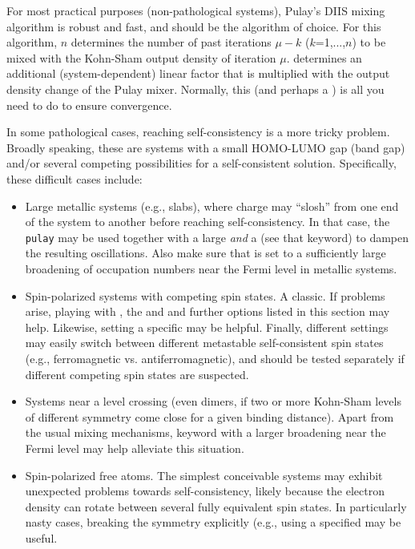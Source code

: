 For most practical purposes (non-pathological systems), Pulay's DIIS
mixing algorithm \cite{Pulay80} is robust and fast, and should be the
algorithm of choice. For this algorithm,  $n$
determines the number of past iterations $\mu-k$ ($k$=1,...,$n$) to be
mixed with the Kohn-Sham output density of iteration
$\mu$.  determines an additional
(system-dependent) linear factor that is multiplied with the output
density change of the Pulay mixer. Normally, this (and perhaps a
) is all you need to do to ensure convergence.

In some pathological cases, reaching self-consistency is a more tricky
problem. Broadly speaking, these are systems with a small HOMO-LUMO
gap (band gap) and/or several competing possibilities for a
self-consistent solution. Specifically, these difficult cases include: 
\begin{itemize}
  \item Large metallic systems (e.g., slabs), where charge may
    ``slosh'' from one end of the system to another before reaching
    self-consistency. In that case, the \texttt{pulay} 
    may be used together with a large 
    \emph{and} a  (see that keyword) to dampen
    the resulting oscillations. Also make sure that
     is set to a sufficiently large
    broadening of occupation numbers near the Fermi level in metallic
    systems. 
  \item Spin-polarized systems with competing spin states. A
    classic. If problems arise, playing with
    , the 
    and  and further options listed in this
    section may help. Likewise, setting a specific
     may be helpful. Finally, different
     settings may easily switch between
    different metastable self-consistent spin states (e.g.,
    ferromagnetic vs. antiferromagnetic), and should be tested
    separately if different competing spin states are suspected.
  \item Systems near a level crossing (even dimers, if two or more
    Kohn-Sham levels of different symmetry come close for a given
    binding distance). Apart from the usual mixing mechanisms, keyword
     with a larger broadening near the Fermi
    level may help alleviate this situation.
  \item Spin-polarized free atoms. The simplest conceivable systems
    may exhibit unexpected problems towards self-consistency, likely
    because the electron density can rotate between several fully
    equivalent spin states. In particularly nasty cases, breaking the
    symmetry explicitly (e.g., using a specified
     may be useful.
\end{itemize}
